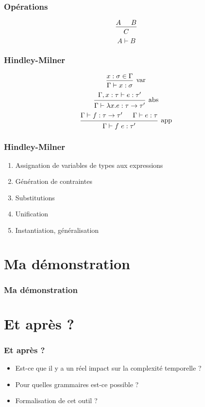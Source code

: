 \documentclass{beamer}
\begin{document}
\begin{frame}
		\frametitle{Opérations}
		\begin{center}
				\[
				\begin{prooftree}
						\hypo{A}
						\hypo{B}
						\infer2{C}
				\end{prooftree}
				\]
				\newline
				\[
				A \vdash B
				\]
		\end{center}
\end{frame}

\begin{frame}
\frametitle{Hindley-Milner}
		\[
		\begin{prooftree}
				\hypo{x:\sigma\in\Gamma}
				\infer1[var]{\Gamma \vdash x:\sigma}
		\end{prooftree}
		\]
		\newline
		\[
		\begin{prooftree}
				\hypo{\Gamma, x:\tau \vdash e:\tau'}
				\infer1[abs]{\Gamma \vdash \lambda x.e:\tau \to \tau'}
		\end{prooftree}
		\]
		\newline
		\[
		\begin{prooftree}
				\hypo{\Gamma \vdash f:\tau \to \tau'}
				\hypo{\Gamma \vdash e : \tau}
				\infer2[app]{\Gamma \vdash f\ e : \tau'}
		\end{prooftree}
		\]
\end{frame}

\begin{frame}
		\frametitle{Hindley-Milner}
		\begin{enumerate}
				\item Assignation de variables de types aux expressions
				\item Génération de contraintes
				\item Substitutions
				\item Unification
				\item Instantiation, généralisation
		\end{enumerate}
\end{frame}

\section{Ma démonstration}
\begin{frame}
		\frametitle{Ma démonstration}
\end{frame}

\section{Et après ?}
\begin{frame}
		\frametitle{Et après ?}
		\begin{itemize}
				\item<1-> Est-ce que il y a un réel impact sur la complexité temporelle ?
				\item<2->Pour quelles grammaires est-ce possible ?
				\item<3->Formalisation de cet outil ?
		\end{itemize}
\end{frame}
\end{document}
